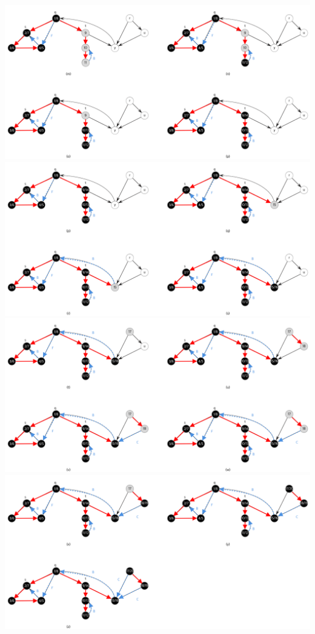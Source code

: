 \documentclass[12pt]{article}
\begin{document}
\begin{enumerate}[1.]
\begin{center}
    \includegraphics[width=\linewidth]{images/worksheet_4_solution_27.png}
    \includegraphics[width=\linewidth]{images/worksheet_4_solution_28.png}
    \includegraphics[width=\linewidth]{images/worksheet_4_solution_29.png}
    \includegraphics[width=\linewidth]{images/worksheet_4_solution_30.png}
    \end{center}


\end{enumerate}
\end{document}
